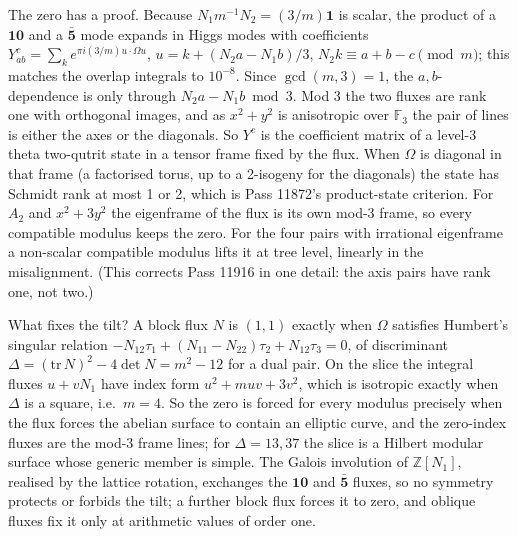 The zero has a proof. Because $N_1m^{-1}N_2=(3/m)\mathbf1$ is scalar, the product of a $\mathbf{10}$ and a $\bar{\mathbf5}$ mode expands in Higgs modes with coefficients $Y^c_{ab}=\sum_k e^{\pi i(3/m)u\cdot\Omega u}$, $u=k+(N_2a-N_1b)/3$, $N_2k\equiv a+b-c\pmod m$; this matches the overlap integrals to $10^{-8}$. Since $\gcd(m,3)=1$, the $a,b$-dependence is only through $N_2a-N_1b\bmod 3$. Mod 3 the two fluxes are rank one with orthogonal images, and as $x^2+y^2$ is anisotropic over $\mathbb F_3$ the pair of lines is either the axes or the diagonals. So $Y^c$ is the coefficient matrix of a level-3 theta two-qutrit state in a tensor frame fixed by the flux. When $\Omega$ is diagonal in that frame (a factorised torus, up to a 2-isogeny for the diagonals) the state has Schmidt rank at most 1 or 2, which is Pass 11872's product-state criterion. For $A_2$ and $x^2+3y^2$ the eigenframe of the flux is its own mod-3 frame, so every compatible modulus keeps the zero. For the four pairs with irrational eigenframe a non-scalar compatible modulus lifts it at tree level, linearly in the misalignment. (This corrects Pass 11916 in one detail: the axis pairs have rank one, not two.) 

What fixes the tilt? A block flux $N$ is $(1,1)$ exactly when $\Omega$ satisfies Humbert's singular relation $-N_{12}\tau_1+(N_{11}-N_{22})\tau_2+N_{12}\tau_3=0$, of discriminant $\Delta=(\mathrm{tr}\,N)^2-4\det N=m^2-12$ for a dual pair. On the slice the integral fluxes $u+vN_1$ have index form $u^2+muv+3v^2$, which is isotropic exactly when $\Delta$ is a square, i.e.\ $m=4$. So the zero is forced for every modulus precisely when the flux forces the abelian surface to contain an elliptic curve, and the zero-index fluxes are the mod-3 frame lines; for $\Delta=13,37$ the slice is a Hilbert modular surface whose generic member is simple. The Galois involution of $\mathbb Z[N_1]$, realised by the lattice rotation, exchanges the $\mathbf{10}$ and $\bar{\mathbf5}$ fluxes, so no symmetry protects or forbids the tilt; a further block flux forces it to zero, and oblique fluxes fix it only at arithmetic values of order one. 

